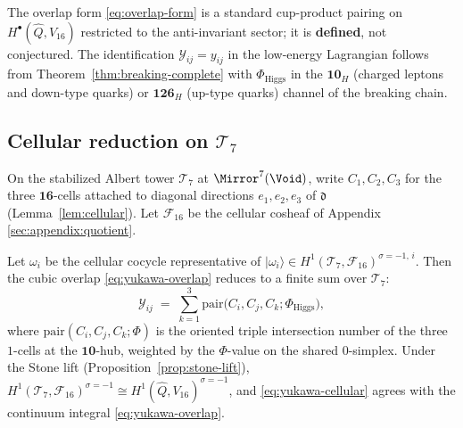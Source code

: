 \begin{remark}
The overlap form \eqref{eq:overlap-form} is a standard cup-product pairing
on $H^\bullet(\hat Q,V_{16})$ restricted to the anti-invariant sector; it is
\textbf{defined}, not conjectured. The identification
$\mathcal{Y}_{ij}=y_{ij}$ in the low-energy Lagrangian follows from
Theorem~\ref{thm:breaking-complete} with $\Phi_{\mathrm{Higgs}}$ in the
$\mathbf{10}_H$ (charged leptons and down-type quarks) or $\mathbf{126}_H$
(up-type quarks) channel of the breaking chain.
\end{remark}

\subsection{Cellular reduction on $\mathcal{T}_7$}
\label{sec:yukawa:cellular}

On the stabilized Albert tower $\mathcal{T}_7$ at $\Mirror^7(\Void)$, write
$C_1,C_2,C_3$ for the three $\mathbf{16}$-cells attached to diagonal
directions $e_1,e_2,e_3$ of $\mathfrak{d}$ (Lemma~\ref{lem:cellular}).
Let $\mathcal{F}_{16}$ be the cellular cosheaf of Appendix
\ref{sec:appendix:quotient}.

\begin{lemma}\label{lem:yukawa-cellular}
Let $\omega_i$ be the cellular cocycle representative of
$|\omega_i\rangle\in H^1(\mathcal{T}_7,\mathcal{F}_{16})^{\sigma=-1,\,i}$.
Then the cubic overlap \eqref{eq:yukawa-overlap} reduces to a finite sum
over $\mathcal{T}_7$:
\begin{equation}\label{eq:yukawa-cellular}
  \mathcal{Y}_{ij}
  \;=\;
  \sum_{k=1}^3
  \mathrm{pair}\!\bigl(C_i,C_j,C_k;\Phi_{\mathrm{Higgs}}\bigr),
\end{equation}
where $\mathrm{pair}(C_i,C_j,C_k;\Phi)$ is the oriented triple intersection
number of the three $1$-cells at the $\mathbf{10}$-hub, weighted by the
$\Phi$-value on the shared $0$-simplex. Under the Stone lift
(Proposition~\ref{prop:stone-lift}),
$H^1(\mathcal{T}_7,\mathcal{F}_{16})^{\sigma=-1}\cong
H^1(\hat Q,V_{16})^{\sigma=-1}$, and \eqref{eq:yukawa-cellular} agrees with
the continuum integral \eqref{eq:yukawa-overlap}.
\end{lemma}

